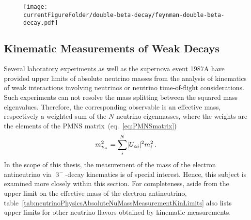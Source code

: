 \begin{figure}[t]
	\centering
	\texttt{[image: \\currentFigureFolder/double-beta-decay/feynman-double-beta-decay.pdf]}
	\label{fig:neutrinoPhysicsAbsoluteNuMassMeasurementDoubleBeta}
\end{figure}

\subsection{Kinematic Measurements of Weak Decays}
\label{sec:neutrinoPhysicsAbsoluteNuMassMeasurementKinematics}
Several laboratory experiments as well as the
supernova event 1987A have provided upper limits of absolute neutrino masses from the analysis of kinematics of weak interactions involving neutrinos or neutrino time-of-flight considerations. Such experiments can not resolve the mass splitting between the squared mass eigenvalues. Therefore, the corresponding observable is an effective mass, respectively a weighted sum of the $N$ neutrino eigenmasses, where the weights are the elements of the PMNS matrix~(eq.~\ref{eq:PMNSmatrix})~\cite{Otten:2008zz}
\begin{equation}
\label{eq:nuMassSquared}
    m^2_{\upnu_{\alpha}} = \sum_{i}^{N}\lvert U_{\alpha i}\rvert^2 m_i^2 \text{\,.}
\end{equation}
In the scope of this thesis, the measurement of the mass of the electron antineutrino via $\upbeta^-$-decay kinematics is of special interest. Hence, this subject is examined more closely within this section. For completeness, aside from the upper limit on the effective mass of the electron antineutrino, table~\ref{tab:neutrinoPhysicsAbsoluteNuMassMeasurementKinLimits} also lists upper limits for other neutrino flavors obtained by kinematic measurements.
